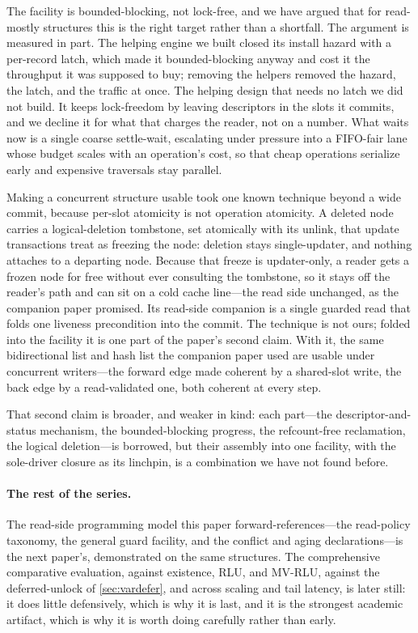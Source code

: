 \documentclass[11pt]{article}
\begin{document}
The facility is bounded-blocking, not lock-free, and we have argued that for
read-mostly structures this is the right target rather than a shortfall. The
argument is measured in part. The helping engine we built closed its install
hazard with a per-record latch, which made it bounded-blocking anyway and cost
it the throughput it was supposed to buy; removing the helpers removed the
hazard, the latch, and the traffic at once. The helping design that needs no
latch we did not build. It keeps lock-freedom by leaving descriptors in the
slots it commits, and we decline it for what that charges the reader, not on a
number. What waits now is a single coarse settle-wait, escalating under
pressure into a FIFO-fair lane whose budget scales with an operation's cost, so
that cheap operations serialize early and expensive traversals stay parallel.

Making a concurrent structure usable took one known technique beyond a wide
commit, because per-slot atomicity is not operation atomicity. A deleted node
carries a logical-deletion tombstone, set atomically with its unlink, that update
transactions treat as freezing the node: deletion stays single-updater, and
nothing attaches to a departing node. Because that freeze is updater-only, a
reader gets a frozen node for free without ever consulting the tombstone, so it
stays off the reader's path and can sit on a cold cache line---the read side
unchanged, as the companion paper promised. Its read-side companion is a single
guarded read that folds one liveness precondition into the commit. The technique
is not ours; folded into the facility it is one part of the paper's second claim.
With it, the same bidirectional list and hash list the companion paper used are
usable under concurrent writers---the forward edge made coherent by a shared-slot
write, the back edge by a read-validated one, both coherent at every step.

That second claim is broader, and weaker in kind: each part---the
descriptor-and-status mechanism, the bounded-blocking progress, the refcount-free
reclamation, the logical deletion---is borrowed, but their assembly into one
facility, with the sole-driver closure as its linchpin, is a combination we have
not found before.

\paragraph{The rest of the series.} The read-side programming model this paper
forward-references---the read-policy taxonomy, the general guard facility, and the
conflict and aging declarations---is the next paper's, demonstrated on the same
structures. The comprehensive comparative evaluation, against existence, RLU, and
MV-RLU, against the deferred-unlock \kcas of \cref{sec:vardefer}, and across
scaling and tail latency, is later still: it does little
defensively, which is why it is last, and it is the strongest academic artifact,
which is why it is worth doing carefully rather than early.
\end{document}
